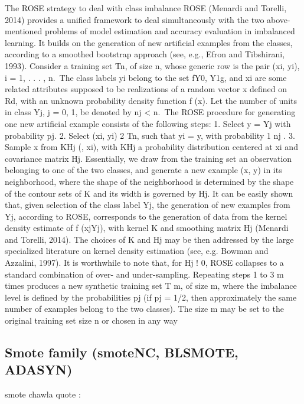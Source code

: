 \documentclass[
]{report}
\begin{document}
The ROSE strategy to deal with class imbalance
ROSE (Menardi and Torelli, 2014) provides a unified framework to deal simultaneously with the two
above-mentioned problems of model estimation and accuracy evaluation in imbalanced learning. It
builds on the generation of new artificial examples from the classes, according to a smoothed bootstrap
approach (see, e.g., Efron and Tibshirani, 1993).
Consider a training set Tn, of size n, whose generic row is the pair (xi, yi), i = 1, . . . , n.~The class
labels yi belong to the set fY0, Y1g, and xi are some related attributes supposed to be realizations of a
random vector x defined on Rd, with an unknown probability density function f (x). Let the number of
units in class Yj, j = 0, 1, be denoted by nj \textless{} n.~The ROSE procedure for generating one new artificial
example consists of the following steps:
1. Select y = Yj with probability pj.
2. Select (xi, yi) 2 Tn, such that yi = y, with probability 1
nj
.
3. Sample x from KHj (, xi), with KHj a probability distribution centered at xi and covariance
matrix Hj.
Essentially, we draw from the training set an observation belonging to one of the two classes, and generate
a new example (x, y) in its neighborhood, where the shape of the neighborhood is determined
by the shape of the contour sets of K and its width is governed by Hj.
It can be easily shown that, given selection of the class label Yj, the generation of new examples
from Yj, according to ROSE, corresponds to the generation of data from the kernel density estimate of
f (xjYj), with kernel K and smoothing matrix Hj (Menardi and Torelli, 2014). The choices of K and
Hj may be then addressed by the large specialized literature on kernel density estimation (see, e.g.
Bowman and Azzalini, 1997). It is worthwhile to note that, for Hj ! 0, ROSE collapses to a standard
combination of over- and under-sampling.
Repeating steps 1 to 3 m times produces a new synthetic training set T
m, of size m, where the
imbalance level is defined by the probabilities pj (if pj = 1/2, then approximately the same number of
examples belong to the two classes). The size m may be set to the original training set size n or chosen
in any way

\hypertarget{smote-family-smotenc-blsmote-adasyn}{%
\subsection{Smote family (smoteNC, BLSMOTE, ADASYN)}\label{smote-family-smotenc-blsmote-adasyn}}

smote chawla quote :
\end{document}
